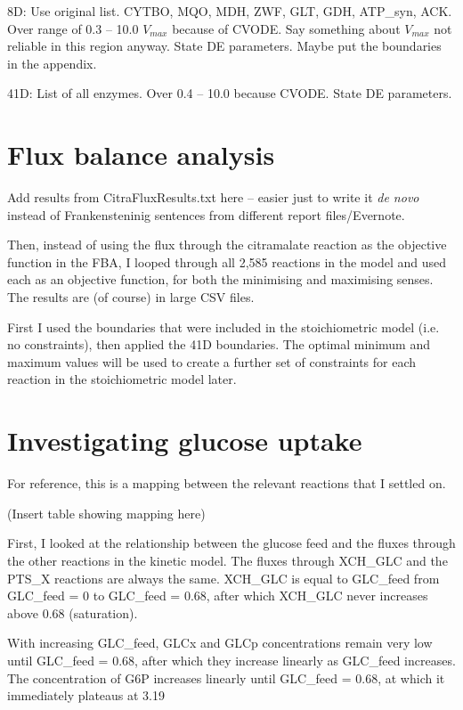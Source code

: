 \documentclass[parskip=full]{scrreprt}
\begin{document}
8D: Use original list. CYTBO, MQO, MDH, ZWF, GLT, GDH, ATP\_syn, ACK. Over range of 0.3 -- 10.0 $V_{max}$ because of CVODE. Say something about $V_{max}$ not reliable in this region anyway. State DE parameters. Maybe put the boundaries in the appendix.

41D: List of all enzymes. Over 0.4 -- 10.0 because CVODE. State DE parameters.

\section{Flux balance analysis}
\label{sec:fba}

Add results from CitraFluxResults.txt here -- easier just to write it \emph{de novo} instead of Frankensteninig sentences from different report files/Evernote.

Then, instead of using the flux through the citramalate reaction as the objective function in the FBA, I looped through all 2,585 reactions in the model and used each as an objective function, for both the minimising and maximising senses. The results are (of course) in large CSV files.

First I used the boundaries that were included in the stoichiometric model (i.e. no constraints), then applied the 41D boundaries. The optimal minimum and maximum values will be used to create a further set of constraints for each reaction in the stoichiometric model later.

\section{Investigating glucose uptake}
\label{sec:glucoseuptake}

For reference, this is a mapping between the relevant reactions that I settled on.

(Insert table showing mapping here)

First, I looked at the relationship between the glucose feed and the fluxes through the other reactions in the kinetic model. The fluxes through XCH\_GLC and the PTS\_X reactions are always the same. XCH\_GLC is equal to GLC\_feed from GLC\_feed = 0 to GLC\_feed = 0.68, after which XCH\_GLC never increases above 0.68 (saturation).

With increasing GLC\_feed, GLCx and GLCp concentrations remain very low until GLC\_feed = 0.68, after which they increase linearly as GLC\_feed increases. The concentration of G6P increases linearly until GLC\_feed = 0.68, at which it immediately plateaus at 3.19
\end{document}
